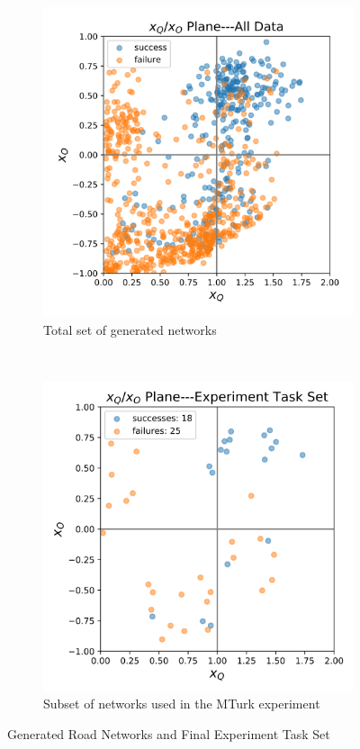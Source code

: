 \begin{figure}[tbp]
    \centering
    \begin{subfigure}[b]{0.80\linewidth}
        \centering
        \includegraphics[width=0.95\linewidth]{Figures/xQxO_Plane.png}
        \vfill
        \caption{Total set of generated networks}
        \label{fig:appendix_tot_set}
    \end{subfigure}%
    \\
    \begin{subfigure}[b]{0.80\linewidth}
        \centering
        \includegraphics[width=0.95\linewidth]{Figures/xQxO_plane_experiment_set.png}
        \caption{Subset of networks used in the MTurk experiment}
        \label{fig:appendix_exp_set}
    \end{subfigure} 
    \caption{Generated Road Networks and Final Experiment Task Set}
    \label{fig:appendix_exp_data}
    \vspace{-0.2cm}
\end{figure}

